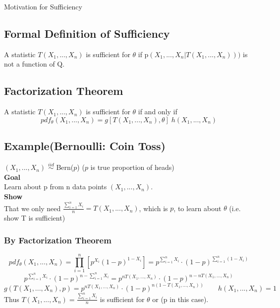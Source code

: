 \documentclass[12pt]{article}
\begin{document}
\begin{section}{Motivation for Sufficiency}
\section{Formal Definition of Sufficiency}
A statistic $T(X_1,...,X_n)$ is sufficient for $\theta$ if p$(X_1,...,X_n|T(X_1,...,X_n)))$ is not a function of Q.
\subsection{Factorization Theorem}
A statistic $T(X_1,...,X_n)$ is sufficient for $\theta$ if and only if $$pdf_{\theta}(X_1,...,X_n) 
= g[T(X_1,...,X_n),\theta]\; h(X_1,...,X_n)$$
\subsection{Example(Bernoulli: Coin Toss)}
$(X_1,...,X_n)$ $\stackrel{iid}{\sim}$ Bern($p$) ($p$ is true proportion of heads)\\

\textbf{Goal} \\Learn about p from n data points $(X_1,...,X_n)$.\\
\textbf{Show} \\That we only need $\frac{\sum_{i=1}^n X_i}{n} = T(X_1,...,X_n)$, which is $p$, to learn about $\theta$ (i.e. show T is sufficient)

\subsubsection{By Factorization Theorem}
$$pdf_{\theta}(X_1,...,X_n) = \prod_{i=1}^n[p^{X_i}(1-p)^{1-X_i}] = p^{\sum_{i=1}^n X_i} \cdot (1-p)^{\sum_{i=1}^n (1-X_i)}$$
$$p^{\sum_{i=1}^n X_i} \cdot (1-p)^{n - \sum_{i=1}^n X_i} = p^{nT(X_1,...,X_n)} \cdot (1-p)^{n-nT(X_1,...,X_n)} $$ 
$$g(T(X_1,...,X_n), p) = p^{nT(X_1,...,X_n)} \cdot (1-p)^{n(1-T(X_1,...,X_n))} \qquad h(X_1,...,X_n)=1$$
\newline
Thus $T(X_1,...,X_n) = \frac{\sum_{i=1}^n X_i}{n}$ is sufficient for $\theta$ or (p in this case).


\end{section}
\end{document}
